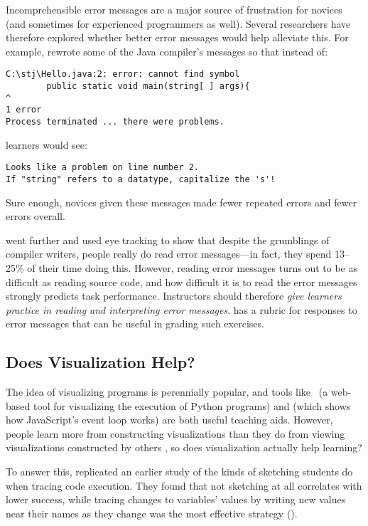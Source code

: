 
Incomprehensible error messages are a major source of frustration for
novices (and sometimes for experienced programmers as well). Several
researchers have therefore explored whether better error messages would
help alleviate this. For example, \cite{Beck2016} rewrote some of the
Java compiler's messages so that instead of:

\begin{verbatim}
C:\stj\Hello.java:2: error: cannot find symbol
        public static void main(string[ ] args){
^
1 error
Process terminated ... there were problems.
\end{verbatim}

learners would see:

\begin{verbatim}
Looks like a problem on line number 2.
If "string" refers to a datatype, capitalize the 's'!
\end{verbatim}

Sure enough, novices given these messages made fewer repeated errors and
fewer errors overall.

\cite{Bari2017} went further and used eye tracking to show that
despite the grumblings of compiler writers, people really do read error
messages---in fact, they spend 13--25\% of their time doing this. However,
reading error messages turns out to be as difficult as reading source
code, and how difficult it is to read the error messages strongly
predicts task performance. Instructors should therefore \emph{give learners
practice in reading and interpreting error messages}. \cite{Marc2011}
has a rubric for responses to error messages that can be useful in
grading such exercises.

\subsection*{Does Visualization Help?}

The idea of visualizing programs is perennially popular, and tools
like~\cite{Guo2013} (a web-based tool for visualizing the
execution of Python programs) and  (which shows how
JavaScript's event loop works) are both useful teaching aids.
However, people learn more from constructing visualizations than they
do from viewing visualizations constructed by others
\cite{Stas1998,Ceti2016}, so does visualization actually
help learning?

To answer this, \cite{Cunn2017} replicated an earlier study of the
kinds of sketching students do when tracing code execution. They found
that not sketching at all correlates with lower success, while tracing
changes to variables' values by writing new values near their names as
they change was the most effective strategy ().

